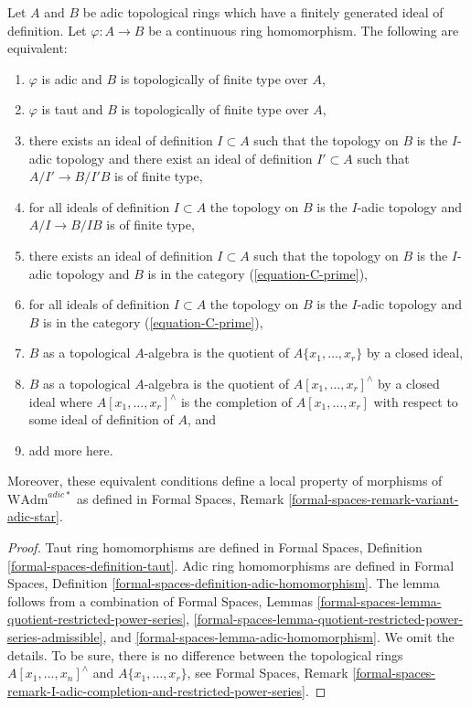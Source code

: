 \begin{lemma}
\label{lemma-finite-type}
Let $A$ and $B$ be adic topological rings which have a finitely generated
ideal of definition. Let $\varphi : A \to B$ be a continuous ring homomorphism.
The following are equivalent:
\begin{enumerate}
\item $\varphi$ is adic and $B$ is topologically of finite type over $A$,
\item $\varphi$ is taut and $B$ is topologically of finite type over $A$,
\item there exists an ideal of definition $I \subset A$ such that
the topology on $B$ is the $I$-adic topology and there exist an ideal
of definition $I' \subset A$ such that $A/I' \to B/I'B$ is of finite type,
\item for all ideals of definition $I \subset A$ the topology on $B$
is the $I$-adic topology and $A/I \to B/IB$ is of finite type,
\item there exists an ideal of definition $I \subset A$ such that
the topology on $B$ is the $I$-adic topology and $B$ is in the category
(\ref{equation-C-prime}),
\item for all ideals of definition $I \subset A$ the topology on $B$
is the $I$-adic topology and $B$ is in the category (\ref{equation-C-prime}),
\item $B$ as a topological $A$-algebra is the quotient of
$A\{x_1, \ldots, x_r\}$ by a closed ideal,
\item $B$ as a topological $A$-algebra is the quotient of
$A[x_1, \ldots, x_r]^\wedge$ by a closed ideal where
$A[x_1, \ldots, x_r]^\wedge$ is the completion of $A[x_1, \ldots, x_r]$
with respect to some ideal of definition of $A$, and
\item add more here.
\end{enumerate}
Moreover, these equivalent conditions define
a local property of morphisms of $\text{WAdm}^{adic*}$ as defined in
Formal Spaces, Remark \ref{formal-spaces-remark-variant-adic-star}.
\end{lemma}

\begin{proof}
Taut ring homomorphisms are defined in
Formal Spaces, Definition \ref{formal-spaces-definition-taut}.
Adic ring homomorphisms are defined in
Formal Spaces, Definition
\ref{formal-spaces-definition-adic-homomorphism}.
The lemma follows from a combination of
Formal Spaces, Lemmas
\ref{formal-spaces-lemma-quotient-restricted-power-series},
\ref{formal-spaces-lemma-quotient-restricted-power-series-admissible}, and
\ref{formal-spaces-lemma-adic-homomorphism}. We omit the details.
To be sure, there is no difference between the topological rings
$A[x_1, \ldots, x_n]^\wedge$ and $A\{x_1, \ldots, x_r\}$, see
Formal Spaces, Remark
\ref{formal-spaces-remark-I-adic-completion-and-restricted-power-series}.
\end{proof}

